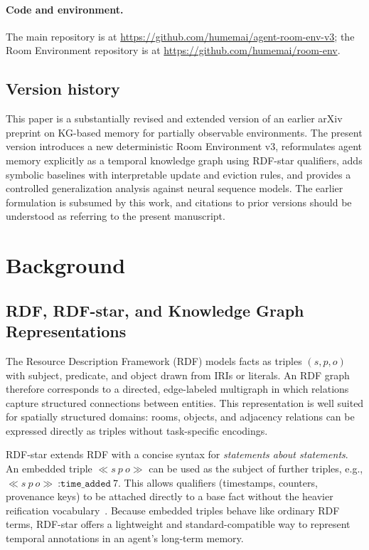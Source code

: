 \documentclass[11pt]{article}
\begin{document}
\paragraph{Code and environment.}
The main repository is at \url{https://github.com/humemai/agent-room-env-v3};
the Room Environment repository is at \url{https://github.com/humemai/room-env}.

\subsection*{Version history}
This paper is a substantially revised and extended version of an earlier
arXiv preprint on KG-based memory for partially observable environments.
The present version introduces a new deterministic Room Environment v3,
reformulates agent memory explicitly as a temporal knowledge graph using
RDF-star qualifiers, adds symbolic baselines with interpretable update and
eviction rules, and provides a controlled generalization analysis against
neural sequence models. The earlier formulation is subsumed by this work,
and citations to prior versions should be understood as referring to the
present manuscript.

\section{Background}

\subsection{RDF, RDF-star, and Knowledge Graph Representations}

The Resource Description Framework (RDF) models facts as triples
$(s,p,o)$ with subject, predicate, and object drawn from IRIs or
literals. An RDF graph therefore corresponds to a directed,
edge-labeled multigraph in which relations capture structured
connections between entities. This representation is well suited for
spatially structured domains: rooms, objects, and adjacency relations
can be expressed directly as triples without task-specific encodings.

RDF-star extends RDF with a concise syntax for \emph{statements about
statements}. An embedded triple $\ll s\ p\ o\gg$ can be used as the
subject of further triples, e.g.,
$\ll s\ p\ o\gg\ \texttt{:time\_added}\ 7$. This allows qualifiers
(timestamps, counters, provenance keys) to be attached directly to a
base fact without the heavier reification vocabulary~\cite{hartig2021foundationsalternativeapproachreification}. Because embedded
triples behave like ordinary RDF terms, RDF-star offers a lightweight
and standard-compatible way to represent temporal annotations in an
agent’s long-term memory.
\end{document}
